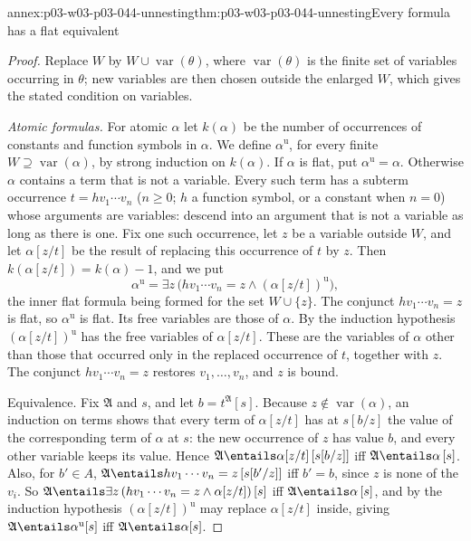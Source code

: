 \begin{annexitem}{annex:p03-w03-p03-044-unnesting}{thm:p03-w03-p03-044-unnesting}{Every formula has a flat equivalent}
\begin{proof}
Replace \(W\) by \(W\cup\operatorname{var}(\theta)\), where
\(\operatorname{var}(\theta)\) is the finite set of variables occurring in
\(\theta\); new variables are then chosen outside the enlarged \(W\), which
gives the stated condition on variables.

\emph{Atomic formulas.}  For atomic \(\alpha\) let \(k(\alpha)\) be the
number of occurrences of constants and function symbols in \(\alpha\).  We
define \(\alpha^{\mathrm u}\), for every finite \(W\supseteq\operatorname
{var}(\alpha)\), by strong induction on \(k(\alpha)\).  If \(\alpha\) is
flat, put \(\alpha^{\mathrm u}=\alpha\).  Otherwise \(\alpha\) contains a
term that is not a variable.  Every such term has a subterm occurrence
\(t=hv_1\cdots v_n\) (\(n\ge0\); \(h\) a function symbol, or a constant
when \(n=0\)) whose arguments are variables: descend into an argument that
is not a variable as long as there is one.  Fix one such occurrence, let
\(z\) be a variable outside \(W\), and let \(\alpha[z/t]\) be the result of
replacing this occurrence of \(t\) by \(z\).  Then
\(k(\alpha[z/t])=k(\alpha)-1\), and we put
\[
 \alpha^{\mathrm u}=\exists z\,\bigl(hv_1\cdots v_n=z\land
 (\alpha[z/t])^{\mathrm u}\bigr),
\]
the inner flat formula being formed for the set \(W\cup\{z\}\).  The
conjunct \(hv_1\cdots v_n=z\) is flat, so \(\alpha^{\mathrm u}\) is flat.
Its free variables are those of \(\alpha\).  By the induction hypothesis
\((\alpha[z/t])^{\mathrm u}\) has the free variables of \(\alpha[z/t]\).
These are the variables of \(\alpha\) other than those that occurred only
in the replaced occurrence of \(t\), together with \(z\).  The conjunct
\(hv_1\cdots v_n=z\) restores \(v_1,\ldots,v_n\), and \(z\) is bound.

Equivalence.  Fix \(\mathfrak A\) and \(s\), and let
\(b=t^{\mathfrak A}[s]\).  Because \(z\notin\operatorname{var}(\alpha)\), an
induction on terms shows that every term of \(\alpha[z/t]\) has at
\(s[b/z]\) the value of the corresponding term of \(\alpha\) at \(s\): the
new occurrence of \(z\) has value \(b\), and every other variable keeps its
value.  Hence \(\mathfrak A\entails\alpha[z/t]\,[s[b/z]]\) iff
\(\mathfrak A\entails\alpha\,[s]\).  Also, for \(b'\in A\),
\(\mathfrak A\entails hv_1\cdots v_n=z\,[s[b'/z]]\) iff \(b'=b\), since
\(z\) is none of the \(v_i\).  So
\(\mathfrak A\entails\exists z\,(hv_1\cdots v_n=z\land\alpha[z/t])\,[s]\)
iff \(\mathfrak A\entails\alpha\,[s]\), and by the induction hypothesis
\((\alpha[z/t])^{\mathrm u}\) may replace \(\alpha[z/t]\) inside, giving
\(\mathfrak A\entails\alpha^{\mathrm u}[s]\) iff
\(\mathfrak A\entails\alpha[s]\).


\end{proof}
\end{annexitem}
